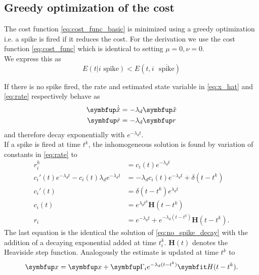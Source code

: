 \subsection{Greedy optimization of the cost}
The cost function \cref{eq:cost_func_basic} is minimized using a greedy optimization i.e. a spike is fired if it reduces the cost. For the derivation we use the cost function \cref{eq:cost_func} which is identical to setting $\mu = 0,\nu= 0$.\\
We express this as
\begin{equation}\label{eq:spike_condition}
	E(t|i \text{ spike}) < E(t,i \text{ }\overline{\text{spike}})
\end{equation}

If there is no spike fired, the rate and estimated state variable in \cref{eq:x_hat} and \cref{eq:rate} respectively behave as
\begin{equation}\label{eq:no_spike_decay}
\begin{aligned}
\bmu{\dot{\hat{x}}} &= -\lambda_d \bmu{\hat{x}}\\
\bmu{\dot{r}} &= -\lambda_d\bmu{r}
\end{aligned}
\end{equation}
and therefore decay exponentially with $e^{-\lambda_d t}$.\\
If a spike is fired at time $t^k$, the inhomogeneous solution is found by variation of constants in \cref{eq:rate} to
\begin{equation}\label{eq:rate_inhomo}
\begin{aligned}
r_i^h &= c_i(t)e^{-\lambda_d t}\\
c_i'(t) e^{-\lambda_d t} - c_i(t)\lambda_d e^{-\lambda_d t}&= -\lambda_d c_i(t)e^{-\lambda_d t} + \delta(t- t^k)\\
c_i'(t) &= \delta(t- t^k) e^{\lambda_d t}\\
c_i(t) &=  e^{\lambda_d t^k} \bm{H}(t-t^k)\\
r_i &=e^{-\lambda_d t} + e^{-\lambda_d (t-t^k)} \bm{H}(t-t^k).
\end{aligned}
\end{equation}
The last equation is the identical the solution of \cref{eq:no_spike_decay} with the addition of a decaying exponential added at time $t_i^k$. $\bm{H}(t)$ denotes the Heaviside step function. Analogously the estimate is updated at time $t^k$ to
\begin{equation}\label{eq:update_x_spike}
	\bmu{x} =  \bmu{x} + \bmu{\Gamma}_ie^{-\lambda_d (t-t^k)} \bm{H}(t-t^k).
\end{equation}
